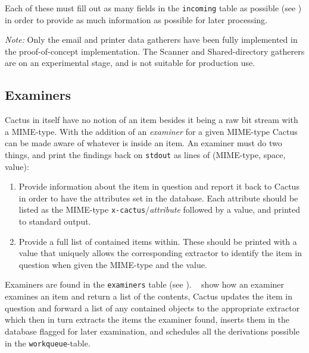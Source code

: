 Each of these must fill out as many fields in the
\texttt{incoming} table as possible (see
) in order to provide as much
information as possible for later processing.

\textit{Note:} Only the email and printer data gatherers
have been fully implemented in the proof-of-concept
implementation.  The Scanner and Shared-directory gatherers
are on an experimental stage, and is not suitable for
production use.


\subsection{Examiners}

Cactus in itself have no notion of an item besides it being
a raw bit stream with a MIME-type.  With the addition of an
\textit{examiner} for a given MIME-type Cactus can be made
aware of whatever is inside an item.  An examiner must do
two things, and print the findings back on \texttt{stdout}
as lines of (MIME-type, space, value):

\begin{enumerate}
\item Provide information about the item in question and
  report it back to Cactus in order to have the attributes
  set in the database.  Each attribute should be listed as
  the MIME-type \texttt{x-cactus}/\textit{attribute}
  followed by a value, and printed to standard output.

\item Provide a full list of contained items within.  These
  should be printed with a value that uniquely allows the
  corresponding extractor to identify the item in question
  when given the MIME-type and the value.
\end{enumerate}


Examiners are found in the \texttt{examiners} table (see
).  ~ show how an examiner
examines an item and return a list of the contents, Cactus updates the
item in question and forward a list of any contained objects to the
appropriate extractor which then in turn extracts the items the examiner
found, inserts them in the database flagged for later examination, and
schedules all the derivations possible in the
\texttt{workqueue}-table.

